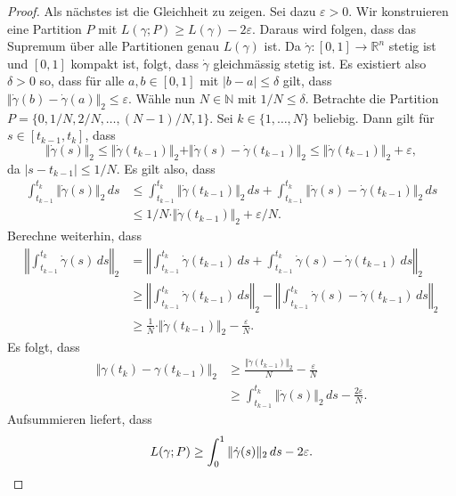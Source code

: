 \documentclass[../main.tex]{subfiles}
\begin{document}
\begin{proof}
  Als nächstes ist die Gleichheit zu zeigen.
  Sei dazu $\varepsilon > 0$.
  Wir konstruieren eine Partition
  $P$ mit $L(\gamma ; P) \geq L(\gamma) - 2\varepsilon$.
  Daraus wird folgen, dass das Supremum über alle Partitionen
  genau $L(\gamma)$ ist.
  Da $\dot \gamma \colon [0, 1] \to \mathbb{R}^n$ stetig ist
  und $[0, 1]$ kompakt ist, folgt, dass $\dot \gamma$ 
  gleichmässig stetig ist.
  Es existiert also $\delta > 0$ so, dass
  für alle $a, b \in [0, 1]$ mit $|b - a| \leq \delta$ 
  gilt, dass 
  $\Vert \dot \gamma(b) - \dot \gamma(a) \Vert_2 \leq \varepsilon$.
  Wähle nun $N \in \mathbb{N}$ mit $1/N \leq \delta$.
  Betrachte die Partition $P = \{0, 1/N, 2/N, \dots, (N-1)/N, 1\}$.
  Sei $k \in \{1, \dots, N\}$ beliebig.
  Dann gilt für $s \in [t_{k-1}, t_k]$, dass
  \[
  \Vert \dot \gamma(s) \Vert_2 \leq \Vert \dot \gamma
  (t_{k-1}) \Vert_2
  + \Vert \dot \gamma (s) - \dot \gamma(t_{k-1}) \Vert_2
  \leq \Vert \dot \gamma(t_{k-1}) \Vert_2 + \varepsilon,
  \]
  da $|s - t_{k-1}| \leq 1/N$.
  Es gilt also, dass
  \begin{align*}
       \int_{t_{k-1}}^{t_k} \Vert \dot \gamma (s) \Vert_2 \, ds 
       &\leq
    \int_{t_{k-1}}^{t_k} \Vert \dot \gamma(t_{k-1}) \Vert_2 \, ds
    + \int_{t_{k-1}}^{t_k} \Vert \dot \gamma(s) - \dot \gamma
    (t_{k-1}) \Vert_2 \, ds \\
       &\leq 1/N \cdot \Vert \dot \gamma(t_{k-1}) \Vert_2 + \varepsilon/N.
  \end{align*}
  Berechne weiterhin, dass
  \begin{align*}
    \left\Vert
    \int_{t_{k-1}}^{t_k} \dot \gamma(s) \, ds
    \right\Vert_2
    &=
    \left\Vert
    \int_{t_{k-1}}^{t_k} \dot \gamma(t_{k-1}) \, ds
    + \int_{t_{k-1}}^{t_k} \dot \gamma(s) - \dot \gamma(t_{k-1}) \, ds
    \right\Vert_2 \\
    &\geq
    \left\Vert
    \int_{t_{k-1}}^{t_k} \dot \gamma(t_{k-1}) \, ds
    \right\Vert_2
    -
    \left\Vert
    \int_{t_{k-1}}^{t_k} \dot \gamma(s) - \dot \gamma(t_{k-1}) \, ds
    \right\Vert_2 \\
    &\geq
    \frac{1}{N} \cdot \Vert \dot \gamma(t_{k-1}) \Vert_2 
    - \frac{\varepsilon}{N}.
  \end{align*}
  Es folgt, dass
  \begin{align*}
    \Vert \gamma(t_k) - \gamma(t_{k-1}) \Vert_2
    & \geq \frac{\Vert \dot \gamma(t_{k-1}) \Vert_2}{N}
    - \frac{\varepsilon}{N}\\
    &\geq \int_{t_{k-1}}^{t_k} \Vert \dot \gamma(s) \Vert_2 \, ds
    - \frac{2\varepsilon}{N}.
  \end{align*}
  Aufsummieren liefert, dass
  \[
    L(\gamma ; P) \geq \int_{0}^{1} \Vert \dot \gamma(s) \Vert_2 \, ds
    - 2 \varepsilon. \qedhere
  \]
\end{proof}
\end{document}
